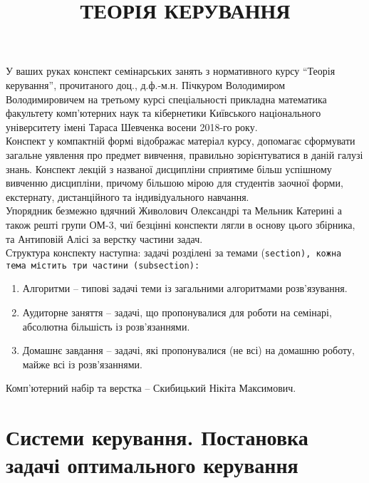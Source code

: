\documentclass[a5paper, 10pt]{article}
\title{{\Huge ТЕОРІЯ КЕРУВАННЯ}}
\date{}
\theoremstyle{definition}
\numberwithin{equation}{section}
\begin{document}
\maketitle \thispagestyle{empty} \newpage 

У ваших руках конспект семінарських занять з нормативного курсу ``Теорія керування'', прочитаного доц., д.ф.-м.н. Пічкуром Володимиром Володимировичем на третьому курсі спеціальності прикладна математика факультету комп\-'ю\-тер\-них наук та кібернетики Київського національного університету імені Тараса Шевченка восени 2018-го року. \\

Конспект у компактній формі відображає матеріал курсу, допомагає сформувати загальне уявлення про предмет вивчення, правильно зорієнтуватися в даній галузі знань. Конспект лекцій з названої дисципліни сприятиме більш успішному вивченню дисципліни, причому більшою мірою для студентів заочної форми, екстернату, дистанційного та індивідуального навчання. \\

Упорядник безмежно вдячний Живолович Олександрі та Мельник Катерині а також решті групи ОМ-3, чиї безцінні конспекти лягли в основу цього збірника, та Антиповій Алісі за верстку частини задач. \\

Структура конспекту наступна: задачі розділені за темами (\tt{section}\normalfont), кожна тема містить три частини (\tt{subsection}\normalfont): 
\begin{enumerate}
	\item Алгоритми -- типові задачі теми із загальними алгоритмами розв'язування.
	\item Аудиторне заняття -- задачі, що пропонувалися для роботи на семінарі, абсолютна більшість із розв'язаннями.
	\item Домашнє завдання -- задачі, які пропонувалися (не всі) на домашню роботу, майже всі із розв'язаннями.
\end{enumerate}

Комп\-'ю\-тер\-ний набір та верстка -- Скибицький Нікіта Максимович.

\newpage

\tableofcontents \newpage

\section{Системи керування. Постановка задачі оптимального керування}
\end{document}
